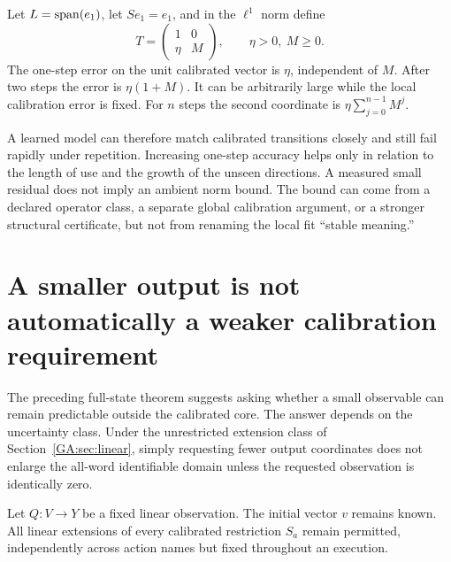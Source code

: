 \begin{GAcounterexample}\label{GA:ce:growth}
Let $L=\operatorname{span}(e_1)$, let $Se_1=e_1$, and in the $\ell^1$ norm define
\[
T=\begin{pmatrix}1&0\\ \eta&M\end{pmatrix},\qquad \eta>0,\ M\ge0.
\]
The one-step error on the unit calibrated vector is $\eta$, independent of $M$. After two steps the error is $\eta(1+M)$. It can be arbitrarily large while the local calibration error is fixed. For $n$ steps the second coordinate is $\eta\sum_{j=0}^{n-1}M^j$.
\end{GAcounterexample}

A learned model can therefore match calibrated transitions closely and still fail rapidly under repetition. Increasing one-step accuracy helps only in relation to the length of use and the growth of the unseen directions. A measured small residual does not imply an ambient norm bound. The bound can come from a declared operator class, a separate global calibration argument, or a stronger structural certificate, but not from renaming the local fit ``stable meaning.''

\section{A smaller output is not automatically a weaker calibration requirement}\label{GA:sec:noenlargement}
The preceding full-state theorem suggests asking whether a small observable can remain predictable outside the calibrated core. The answer depends on the uncertainty class. Under the unrestricted extension class of Section~\ref{GA:sec:linear}, simply requesting fewer output coordinates does not enlarge the all-word identifiable domain unless the requested observation is identically zero.

Let $Q:V\to Y$ be a fixed linear observation. The initial vector $v$ remains known. All linear extensions of every calibrated restriction $S_a$ remain permitted, independently across action names but fixed throughout an execution.

